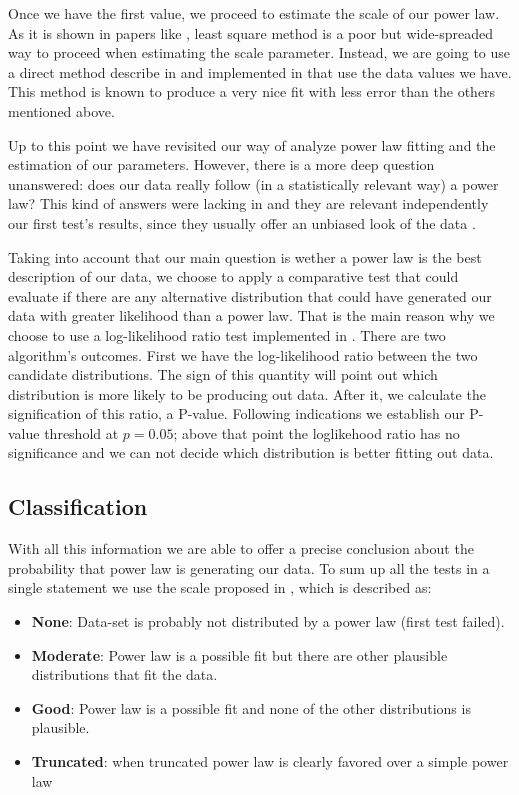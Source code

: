 \documentclass[conference]{IEEEtran}
\begin{document}
Once we have the first value, we proceed to estimate the scale of our power law.
As it is shown in papers like \cite{newman2005power, clauset2009power},
least square method is a poor but wide-spreaded way to proceed when estimating the
scale parameter. Instead, we are going to use a direct method describe in
\cite{clauset2009power} and implemented in \cite{alstott2014powerlaw} that use
the data values we have. This method is known to produce a very nice fit with
less error than the others mentioned above.

Up to this point we have revisited our way of analyze power law fitting and
the estimation of our parameters. However, there is a more deep question unanswered:
does our data really follow (in a statistically relevant way) a power law?
This kind of answers were lacking in \cite{merelo2017self} and they are relevant
independently our first test's results, since they usually offer an unbiased look of the data . 

Taking into account that our main question is wether a power law is the best 
description of our data, we choose to apply a comparative test that could 
evaluate if there are any alternative distribution that could have generated
our data with greater likelihood than a power law. That is the main reason why
we choose to use a log-likelihood ratio test implemented in \cite{alstott2014powerlaw}.
There are two algorithm's outcomes. First we have the log-likelihood ratio between the 
two  candidate  distributions. The sign of this quantity will point out which
distribution is more likely to be producing out data. After it, we calculate the signification 
of this ratio, a P-value. Following \cite{alstott2014powerlaw} indications we establish our P-value threshold at $p=0.05$;
above that point the loglikehood ratio has no significance and we can not decide which distribution
is better fitting out data.

\subsection{Classification}

With all this information we are able to offer a precise conclusion about the 
probability that power law is generating our data. To sum up all the tests in a single 
statement we use the scale proposed in \cite{clauset2009power}, which is described as:
\begin{itemize}
	\item \textbf{None}: Data-set is probably not distributed by a power law (first test failed).   
	\item \textbf{Moderate}: Power law is a possible fit but there are other plausible distributions that fit the data.
	\item \textbf{Good}: Power law is a possible fit and none of the other distributions is plausible.
	\item \textbf{Truncated}: when truncated power law is clearly favored over a simple power law
\end{itemize}
\end{document}
